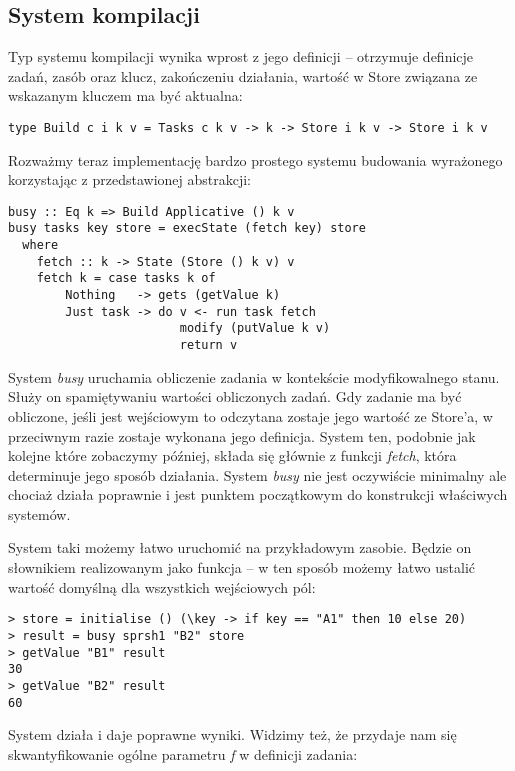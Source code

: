 \subsection{System kompilacji}

Typ systemu kompilacji wynika wprost z jego definicji -- otrzymuje definicje zadań, zasób oraz klucz, zakończeniu działania, wartość w Store związana ze wskazanym kluczem ma być aktualna:

\begin{lstlisting}
type Build c i k v = Tasks c k v -> k -> Store i k v -> Store i k v
\end{lstlisting}

Rozważmy teraz implementację bardzo prostego systemu budowania wyrażonego korzystając z przedstawionej abstrakcji:

\begin{lstlisting}
busy :: Eq k => Build Applicative () k v
busy tasks key store = execState (fetch key) store
  where
    fetch :: k -> State (Store () k v) v
    fetch k = case tasks k of
        Nothing   -> gets (getValue k)
        Just task -> do v <- run task fetch
                        modify (putValue k v)
                        return v
\end{lstlisting}

System \textit{busy} uruchamia obliczenie zadania w kontekście modyfikowalnego stanu. Służy on spamiętywaniu wartości obliczonych zadań. Gdy zadanie ma być obliczone, jeśli jest wejściowym to odczytana zostaje jego wartość ze Store'a, w przeciwnym razie zostaje wykonana jego definicja. System ten, podobnie jak kolejne które zobaczymy później, składa się głównie z funkcji \textit{fetch}, która determinuje jego sposób działania. System \textit{busy} nie jest oczywiście minimalny ale chociaż działa poprawnie i jest punktem początkowym do konstrukcji właściwych systemów.

System taki możemy łatwo uruchomić na przykładowym zasobie. Będzie on słownikiem realizowanym jako funkcja -- w ten sposób możemy łatwo ustalić wartość domyślną dla wszystkich wejściowych pól:

\begin{lstlisting}
> store = initialise () (\key -> if key == "A1" then 10 else 20)
> result = busy sprsh1 "B2" store
> getValue "B1" result
30
> getValue "B2" result
60
\end{lstlisting}

System działa i daje poprawne wyniki. Widzimy też, że przydaje nam się skwantyfikowanie ogólne parametru \textit{f} w definicji zadania:

